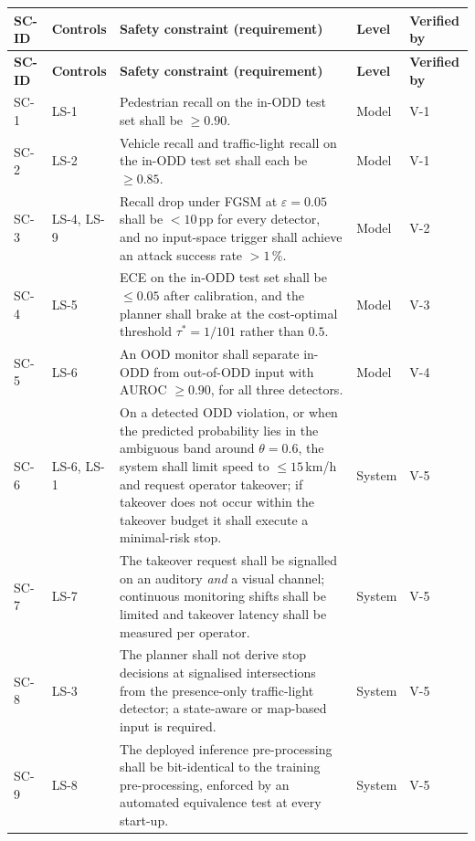 \documentclass[a4paper,12pt]{article}
\begin{document}
{\footnotesize
\begin{longtable}{@{}P{1.0cm}P{1.5cm}P{8.9cm}P{1.5cm}P{1.4cm}@{}}
\toprule
\textbf{SC-ID} & \textbf{Controls} & \textbf{Safety constraint (requirement)} & \textbf{Level} & \textbf{Verified by} \\
\midrule
\endfirsthead
\toprule
\textbf{SC-ID} & \textbf{Controls} & \textbf{Safety constraint (requirement)} & \textbf{Level} & \textbf{Verified by} \\
\midrule
\endhead
\bottomrule
\endlastfoot
SC-1 & LS-1
     & Pedestrian recall on the in-ODD test set shall be $\geq 0.90$.
     & Model & V-1 \\
SC-2 & LS-2
     & Vehicle recall and traffic-light recall on the in-ODD test set shall each be
       $\geq 0.85$.
     & Model & V-1 \\
SC-3 & LS-4, LS-9
     & Recall drop under FGSM at $\varepsilon=0.05$ shall be $<10$\,pp for every detector,
       and no input-space trigger shall achieve an attack success rate $>1\,\%$.
     & Model & V-2 \\
SC-4 & LS-5
     & ECE on the in-ODD test set shall be $\leq 0.05$ after calibration, and the planner
       shall brake at the cost-optimal threshold $\tau^{*}=1/101$ rather than $0.5$.
     & Model & V-3 \\
SC-5 & LS-6
     & An OOD monitor shall separate in-ODD from out-of-ODD input with
       AUROC $\geq 0.90$, for all three detectors.
     & Model & V-4 \\
SC-6 & LS-6, LS-1
     & On a detected ODD violation, or when the predicted probability lies in the
       ambiguous band around $\theta=0.6$, the system shall limit speed to
       $\leq 15$\,km/h and request operator takeover; if takeover does not occur within
       the takeover budget it shall execute a minimal-risk stop.
     & System & V-5 \\
SC-7 & LS-7
     & The takeover request shall be signalled on an auditory \emph{and} a visual channel;
       continuous monitoring shifts shall be limited and takeover latency shall be
       measured per operator.
     & System & V-5 \\
SC-8 & LS-3
     & The planner shall not derive stop decisions at signalised intersections from the
       presence-only traffic-light detector; a state-aware or map-based input is required.
     & System & V-5 \\
SC-9 & LS-8
     & The deployed inference pre-processing shall be bit-identical to the training
       pre-processing, enforced by an automated equivalence test at every start-up.
     & System & V-5 \\
\end{longtable}}
\end{document}
